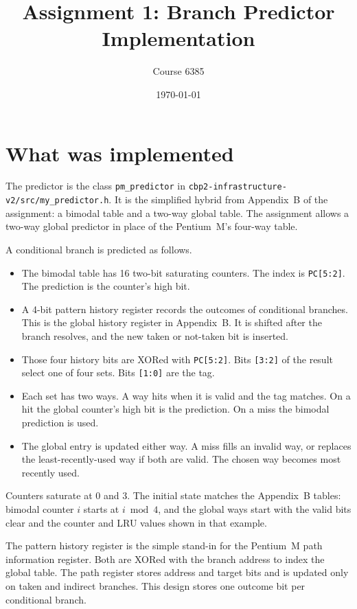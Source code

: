 \documentclass[11pt]{article}
\title{Assignment 1: Branch Predictor Implementation}
\author{Course 6385}
\date{\today}
\begin{document}
\maketitle

\section{What was implemented}

The predictor is the class \texttt{pm\_predictor} in
\texttt{cbp2-infrastructure-v2/src/my\_predictor.h}. It is the simplified
hybrid from Appendix~B of the assignment: a bimodal table and a two-way
global table. The assignment allows a two-way global predictor in place of
the Pentium~M's four-way table.

A conditional branch is predicted as follows.

\begin{itemize}
  \item The bimodal table has 16 two-bit saturating counters. The index is
        \texttt{PC[5:2]}. The prediction is the counter's high bit.
  \item A 4-bit pattern history register records the outcomes of conditional
        branches. This is the global history register in Appendix~B. It is
        shifted after the branch resolves, and the new taken or not-taken bit
        is inserted.
  \item Those four history bits are XORed with \texttt{PC[5:2]}. Bits
        \texttt{[3:2]} of the result select one of four sets. Bits
        \texttt{[1:0]} are the tag.
  \item Each set has two ways. A way hits when it is valid and the tag
        matches. On a hit the global counter's high bit is the prediction.
        On a miss the bimodal prediction is used.
  \item The global entry is updated either way. A miss fills an invalid way,
        or replaces the least-recently-used way if both are valid. The chosen
        way becomes most recently used.
\end{itemize}

Counters saturate at 0 and 3. The initial state matches the Appendix~B tables:
bimodal counter \(i\) starts at \(i \bmod 4\), and the global ways start with
the valid bits clear and the counter and LRU values shown in that example.

The pattern history register is the simple stand-in for the Pentium~M path
information register. Both are XORed with the branch address to index the
global table. The path register stores address and target bits and is updated
only on taken and indirect branches. This design stores one outcome bit per
conditional branch.
\end{document}
